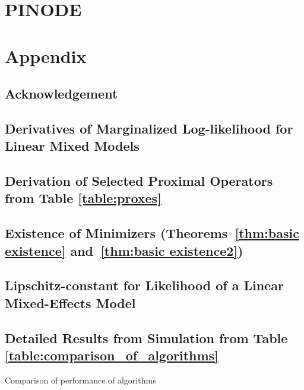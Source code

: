 \documentclass[12pt,a4paper]{book}
\numberwithin{equation}{section} %
\numberwithin{figure}{section} %
\numberwithin{table}{section} %
\begin{document}
\chapter{PINODE}







\clearpage

\appendix
\chapter{Appendix}
\section{Acknowledgement}


\section{Derivatives of Marginalized Log-likelihood for Linear Mixed Models}
\label{appendix:derivatives_of_lmm}


\section{Derivation of Selected Proximal Operators from Table \ref{table:proxes}}
\label{appendix:proxes}


\section{Existence of Minimizers (Theorems~\ref{thm:basic existence} and~\ref{thm:basic existence2})}
\label{adx:basic existence}


\section{Lipschitz-constant for Likelihood of a Linear Mixed-Effects Model}
\label{appendix:lipschitz_constant}


\section{Detailed Results from Simulation from Table \ref{table:comparison_of_algorithms}}
\label{appendix:detailed_comparison}
\begin{table}[t]
    \centering
    \resizebox{\columnwidth}{!}{}
    \caption{Comparison of performance of algorithms}
    \label{table:detailed_comparison_of_algorithms}
\end{table}
\end{document}
